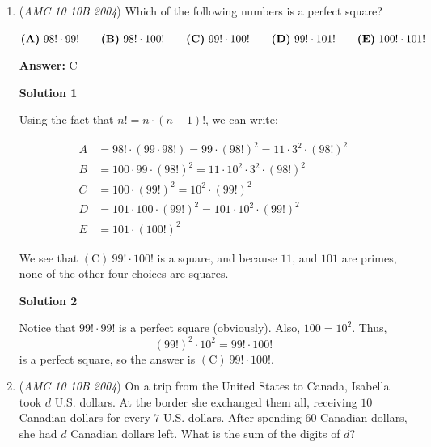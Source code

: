 \begin{enumerate}
 



\textbf{Solution 2}

We first minimize $d$ as $0$, since is it subtracted and is independent from the rest. Then we are left with $a$, $b$, $c$ is from the set ${1,2,3}$. Then after some logical tries we can get $1\cdot3^2-0=\boxed{\mathrm{(D)}\ 9}$ is the largest.

 


	\item (\textit{AMC 10 10B 2004}) Which of the following numbers is a perfect square?


 $\noindent \textbf{(A)}\ 98! \cdot 99! \qquad \textbf{(B)}\ 98! \cdot 100! \qquad \textbf{(C)}\ 99! \cdot 100! \qquad \textbf{(D)}\ 99! \cdot 101! \qquad \textbf{(E)}\ 100! \cdot 101!$

 \textbf{Answer: }C



\textbf{Solution 1}

Using the fact that $n! = n\cdot (n-1)!$, we can write:

 
 \begin{align} A&=98! \cdot (99\cdot 98!) = 99 \cdot (98!)^2 = 11\cdot3^2\cdot(98!)^2 \\ B&=100 \cdot 99 \cdot (98!)^2 = 11\cdot10^2\cdot3^2\cdot( 98!)^2 \\ C&=100\cdot (99!)^2 = 10^2\cdot (99!)^2\\ D&=101\cdot 100\cdot (99!)^2 = 101 \cdot 10^2 \cdot (99!)^2\\ E& =101\cdot (100!)^2 \end{align}

 We see that $\boxed{\mathrm{(C) \ } 99! \cdot 100!}$ is a square, and because $11$, and $101$ are primes, none of the other four choices are squares.

 


 



\textbf{Solution 2}

Notice that $99! \cdot 99!$ is a perfect square (obviously). Also, $100 = 10^2$. Thus, 
 \[(99!)^2 \cdot 10^2 = 99! \cdot 100!\] is a perfect square, so the answer is $\boxed{\mathrm{(C) \ } 99! \cdot 100!}$.

 


	\item (\textit{AMC 10 10B 2004}) On a trip from the United States to Canada, Isabella took $d$ U.S. dollars. At the border she exchanged them all, receiving $10$ Canadian dollars for every $7$ U.S. dollars. After spending $60$ Canadian dollars, she had $d$ Canadian dollars left. What is the sum of the digits of $d$?



\end{enumerate}
